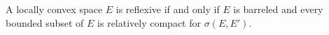 A locally convex space $E$ is reflexive if and only if $E$ is barreled and every bounded subset of $E$ is relatively compact for $\sigma(E, E')$.
